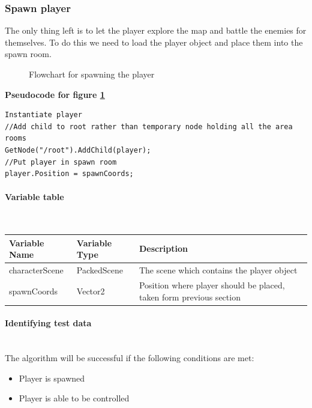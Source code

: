 \documentclass{article}
\newcommand{\myparagraph}[1]{\paragraph{#1}\mbox{}\\} %
\newcommand{\smallBr}{\vspace{1.5mm}}
\begin{document}
\subsubsection{Spawn player}
The only thing left is to let the player explore the map and battle the enemies for themselves. To do this we need to load the player object and place them into the spawn room.

\begin{figure}[h]
    \centering
    \caption{Flowchart for spawning the player}
    \label{fig:spawn player}
\end{figure}

\textbf{Pseudocode for figure \ref{fig:spawn player}}
\begin{lstlisting}
Instantiate player
//Add child to root rather than temporary node holding all the area rooms
GetNode("/root").AddChild(player);
//Put player in spawn room
player.Position = spawnCoords;
\end{lstlisting}

\myparagraph{Variable table}
\smallBr
\begin{tabular}{l|l|l}
Variable Name  & Variable Type & Description                                                         \\ \hline
characterScene & PackedScene   & The scene which contains the player object                          \\
spawnCoords    & Vector2       & Position where player should be placed, taken form previous section
\end{tabular}

\myparagraph{Identifying test data}
The algorithm will be successful if the following conditions are met:
\begin{itemize}
\item{Player is spawned}
\item{Player is able to be controlled}
\end{itemize}
\end{document}
